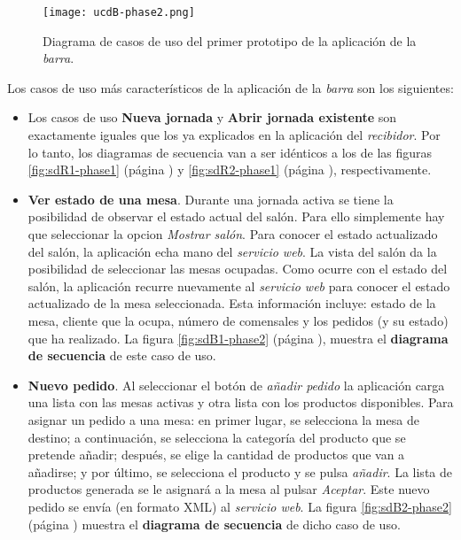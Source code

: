   \begin{figure}[h]
    \begin{center}
      \texttt{[image: ucdB-phase2.png]}
      \caption{Diagrama de casos de uso del primer prototipo de la aplicación
      de la \emph{barra}.}
      \label{fig:ucdB-phase2}
    \end{center}
  \end{figure}

Los casos de uso más característicos de la aplicación de la \emph{barra} son
los siguientes:
\begin{itemize}
\item Los casos de uso \textbf{Nueva jornada} y \textbf{Abrir jornada
existente} son exactamente iguales que los ya explicados en la aplicación
del \emph{recibidor}. Por lo tanto, los diagramas de secuencia van a ser 
idénticos a los de las figuras \ref{fig:sdR1-phase1} (página
\pageref{fig:sdR1-phase1}) y \ref{fig:sdR2-phase1} (página
\pageref{fig:sdR2-phase1}), respectivamente.
\item \textbf{Ver estado de una mesa}. Durante una jornada activa se tiene
la posibilidad de observar el estado actual del salón. Para ello simplemente
hay que seleccionar la opcion \emph{Mostrar salón}. Para conocer el estado
actualizado del salón, la aplicación echa mano del \emph{servicio web}.
La vista del salón da la posibilidad de seleccionar las mesas ocupadas. Como
ocurre con el estado del salón, la aplicación recurre nuevamente al
\emph{servicio web} para conocer el estado actualizado de la mesa seleccionada.
Esta información incluye: estado de la mesa, cliente que la ocupa, número
de comensales y los pedidos (y su estado) que ha realizado. La figura
\ref{fig:sdB1-phase2} (página \pageref{fig:sdB1-phase2}), muestra el
\textbf{diagrama de secuencia} de este caso de uso.

\item \textbf{Nuevo pedido}. Al seleccionar el botón de \emph{añadir pedido}
la aplicación carga una lista con las mesas activas y otra lista con los
productos disponibles. Para asignar un pedido a una mesa: en primer lugar, se
selecciona la mesa de destino; a continuación, se selecciona la categoría
del producto que se pretende añadir; después, se elige la cantidad de
productos que van a añadirse; y por último, se selecciona el producto y se
pulsa \emph{añadir}. La lista de productos generada se le asignará a la mesa
al pulsar \emph{Aceptar}. Este nuevo pedido se envía (en formato \acs{XML})
al \emph{servicio web}. La figura \ref{fig:sdB2-phase2} (página
\pageref{fig:sdB2-phase2}) muestra el \textbf{diagrama de secuencia} de dicho
caso de uso.


\end{itemize}
